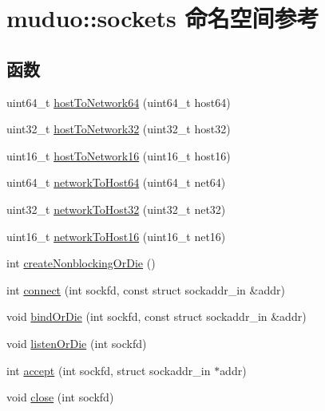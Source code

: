 \hypertarget{namespacemuduo_1_1sockets}{}\section{muduo\+:\+:sockets 命名空间参考}
\label{namespacemuduo_1_1sockets}
\subsection*{函数}
\begin{DoxyCompactItemize}
\item 
uint64\+\_\+t \hyperlink{namespacemuduo_1_1sockets_a6cf7699b950ed4dfbc170a6ff9f71450}{host\+To\+Network64} (uint64\+\_\+t host64)
\item 
uint32\+\_\+t \hyperlink{namespacemuduo_1_1sockets_a937a8685473c938d339f02a8c6d395b6}{host\+To\+Network32} (uint32\+\_\+t host32)
\item 
uint16\+\_\+t \hyperlink{namespacemuduo_1_1sockets_a2c7a9f8e753e01c481aaf287251fa18e}{host\+To\+Network16} (uint16\+\_\+t host16)
\item 
uint64\+\_\+t \hyperlink{namespacemuduo_1_1sockets_ae5a926be124d52254860b4e93a5d1f31}{network\+To\+Host64} (uint64\+\_\+t net64)
\item 
uint32\+\_\+t \hyperlink{namespacemuduo_1_1sockets_a5846c926ef43813d8b8440b6b3a43633}{network\+To\+Host32} (uint32\+\_\+t net32)
\item 
uint16\+\_\+t \hyperlink{namespacemuduo_1_1sockets_aeeb31294e44fee5ecfc4b32f420f6d5d}{network\+To\+Host16} (uint16\+\_\+t net16)
\item 
int \hyperlink{namespacemuduo_1_1sockets_a91269e56d86b2e78e693b330e5c665aa}{create\+Nonblocking\+Or\+Die} ()
\item 
int \hyperlink{namespacemuduo_1_1sockets_a349a8d2188d9632596b2e5213cb16436}{connect} (int sockfd, const struct sockaddr\+\_\+in \&addr)
\item 
void \hyperlink{namespacemuduo_1_1sockets_a8fe4065cd24e49e158dd1c16cd693ae1}{bind\+Or\+Die} (int sockfd, const struct sockaddr\+\_\+in \&addr)
\item 
void \hyperlink{namespacemuduo_1_1sockets_a379cec5f383764a3696d9615bd344529}{listen\+Or\+Die} (int sockfd)
\item 
int \hyperlink{namespacemuduo_1_1sockets_a5fe7cd11cb2662939917285c51b3f992}{accept} (int sockfd, struct sockaddr\+\_\+in $\ast$addr)
\item 
void \hyperlink{namespacemuduo_1_1sockets_acb275b6d8b5979229bae664cb7ee14da}{close} (int sockfd)

\end{DoxyCompactItemize}

